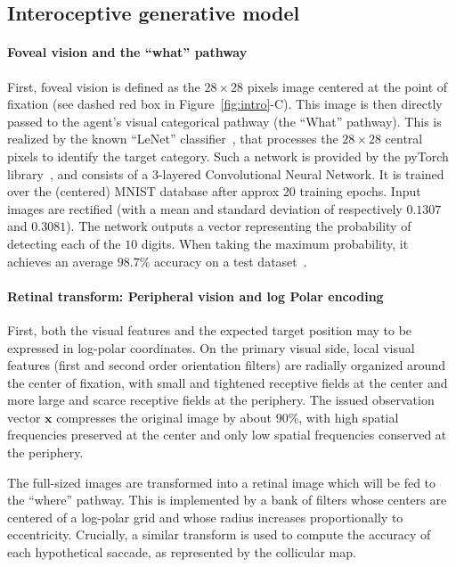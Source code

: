 \subsection{Interoceptive generative model}


\paragraph{Foveal vision and the ``what'' pathway}
First, foveal vision is defined as the $28\times 28$ pixels image centered at the point of fixation (see dashed red box in Figure~\ref{fig:intro}-C). This image is then directly passed to the agent's visual categorical pathway (the ``What'' pathway). This is realized by the known ``LeNet'' classifier~\citep{Lecun1998}, that processes the $28 \times 28$ central pixels to identify the target category. Such a network is provided by the pyTorch library~\citep{Paszke17}, and consists of a 3-layered Convolutional Neural Network. It is trained over the (centered) MNIST database after approx $20$ training epochs. Input images are rectified (with a mean and standard deviation of respectively $0.1307$ and $0.3081$). The network outputs a vector representing the probability of detecting each of the $10$ digits. When taking the maximum probability, it achieves an average $98.7\%$ accuracy on a test dataset~\citep{Lecun1998}. %

\paragraph{Retinal transform: Peripheral vision and log Polar encoding}
First, both the visual features and the expected target position may to be expressed in log-polar coordinates. On the primary visual side, local visual features (first and second order orientation filters) are radially organized around the center of fixation, with small and tightened receptive fields at the center and more large and scarce receptive fields at the periphery. The issued observation vector $\boldsymbol{x}$ compresses the original image by about 90\%, with high spatial frequencies preserved at the center and only low spatial frequencies conserved at the periphery.

The full-sized images are transformed into a retinal image which will be fed to the ``where'' pathway. This is implemented by a bank of filters whose centers are centered of a log-polar grid and whose radius increases proportionally to eccentricity. Crucially, a similar transform is used to compute the accuracy of each hypothetical saccade, as represented by the collicular map. %



